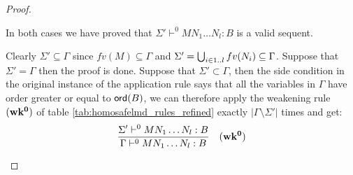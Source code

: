 \begin{proof}
\begin{itemize}
In both cases we have proved that $\Sigma'  \vdash^{0} M N_1 \ldots N_l : B$ is a valid sequent.

Clearly $\Sigma' \subseteq \Gamma$ since $fv(M) \subseteq \Gamma$ and $\Sigma' = \bigcup_{i\in1..l} fv(N_i) \subseteq \Gamma$.
Suppose that $\Sigma' = \Gamma$ then the proof is done.
Suppose that $\Sigma' \subset \Gamma$, then the side condition in the original instance of the application rule says that all
the variables in $\Gamma$ have order
greater or equal to ${\sf ord}(B)$, we can therefore apply the weakening rule $\mathbf{(wk^0)}$
of table \ref{tab:homosafelmd_rules_refined} exactly $|\Gamma\setminus \Sigma'|$ times and get:
$$ \frac{\displaystyle \Sigma'  \vdash^{0} M N_1 \ldots N_l : B}{\Gamma  \vdash^{0} M N_1 \ldots N_l : B} \quad \mathbf{(wk^0)}
$$


\end{itemize}
\end{proof}
